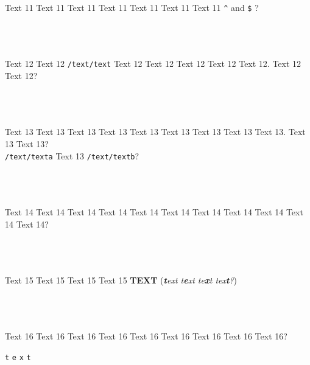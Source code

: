\documentclass[9pt]{exam}
\begin{document}
\begin{questions}
\question
    Text 11 Text 11 Text 11 Text 11 Text 11 Text 11 Text 11
    \texttt{\textasciicircum{}} and \texttt{\$} ?\\\\
    \makebox[0.9\textwidth]{\$ \enspace\hrulefill}\\\\
    \makebox[0.9\textwidth]{\enspace\hrulefill}

\question
    Text 12 Text 12 \texttt{/text/text} Text 12 Text 12 Text 12
    Text 12 Text 12. Text 12 Text 12?\\\\
    \makebox[0.9\textwidth]{\$ \enspace\hrulefill}\\\\
    \makebox[0.9\textwidth]{\enspace\hrulefill}

\question
    Text 13 Text 13 Text 13 Text 13 Text 13 Text 13 Text 13
    Text 13 Text 13. Text 13 Text 13?\\
    \texttt{/text/texta} Text 13 \texttt{/text/textb}?\\\\
    \makebox[0.9\textwidth]{\$ \enspace\hrulefill}\\\\
    \makebox[0.9\textwidth]{\enspace\hrulefill}

\question
    Text 14 Text 14 Text 14 Text 14 Text 14 Text 14 Text 14
    Text 14 Text 14 Text 14 Text 14?\\\\
    \makebox[0.9\textwidth]{\$ \enspace\hrulefill}\\\\
    \makebox[0.9\textwidth]{\enspace\hrulefill}

\question
    Text 15 Text 15 Text 15 Text 15 \textbf{TEXT}
    (\emph{\textbf{t}ext t\textbf{e}xt te\textbf{x}t tex\textbf{t}?})\\\\
    \makebox[0.9\textwidth]{\$ \enspace\hrulefill}\\\\
    \makebox[0.9\textwidth]{\enspace\hrulefill}

\question
    Text 16 Text 16 Text 16 Text 16 Text 16 Text 16 Text 16
    Text 16 Text 16?\\
    \begin{oneparchoices}
     \choice \texttt{t}
     \choice \texttt{e}
     \choice \texttt{x}
     \choice \texttt{t}
    \end{oneparchoices}\\\\
    \\\\
    \makebox[0.9\textwidth]{\enspace\hrulefill{}}


\end{questions}
\end{document}
